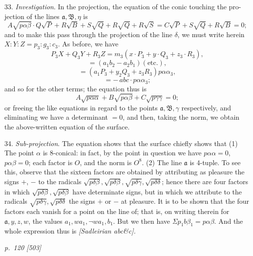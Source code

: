 \documentclass[11pt,a4paper]{book}
\begin{document}
33. \textit{Investigation}. In the projection, the equation of the conic touching the pro-
jection of the lines $\mathfrak{a}, \mathfrak{B}, \eta$ is
\[
A\sqrt{p\alpha\beta} \cdot Q\sqrt{P} + R\sqrt{B} + S\sqrt{Q} + R\sqrt{Q} + R\sqrt{S} = C\sqrt{P} + S\sqrt{Q} + R\sqrt{B} = 0;
\]
and to make this pass through the projection of the line $\delta$, we must write herein
$X : Y : Z = p_3 : g_3 : c_3$. As before, we have
\[
P_3 X + Q_3 Y + R_3 Z = m_3 (x \cdot P_3 + y \cdot Q_3 + z_3 \cdot R_3),
\]
\[
= (a_1 b_2 - a_2 b_1)(\text{etc.}),
\]
\[
= (a_1 P_3 + y_2 Q_3 + z_3 R_3) p\alpha\alpha_3,
\]
\[
= -\,abc \cdot p\alpha\alpha_3;
\]
and so for the other terms; the equation thus is
\[
A\sqrt{p\alpha\alpha} + B\sqrt{p\alpha\beta} + C\sqrt{p\gamma\gamma} = 0;
\]
or freeing the like equations in regard to the points $\mathfrak{a}, \mathfrak{B}, \gamma$ respectively, and eliminating
we have a determinant $= 0$, and then, taking the norm, we obtain the above-written
equation of the surface.

34. \textit{Sub-projection}. The equation shows that the surface chiefly shows that
\quad(1) The point $\alpha$ is 8-conical: in fact, by the point in question we have
$p\alpha\alpha = 0$, $p\alpha\beta = 0$; each factor is $O$, and the norm is $O^8$.
\quad(2) The line $\mathfrak{a}$ is 4-tuple. To see this, observe that the sixteen factors are
obtained by attributing as pleasure the signs $+$, $-$ to the radicals
$\sqrt{p\delta\beta}, \sqrt{p\delta\beta}, \sqrt{p\delta\gamma}, \sqrt{p\delta\delta}$; hence there are four factors in which $\sqrt{p\delta\beta}, \sqrt{p\delta\beta}$ have determinate signs, but in which we attribute to the radicals
$\sqrt{p\delta\gamma}, \sqrt{p\delta\delta}$ the signs $+$ or $-$ at pleasure. It is to be shown that the
four factors each vanish for a point on the line of; that is, on writing
therein for $\mathfrak{a}, y, z, w$, the values $a_1, w a_1, \neg w a_1, b_1$. But we then have
$\Sigma p_1 b\beta_1 = p\alpha\beta$. And the whole expression thus is
\textit{[Sadleirian abc\&c].}

\clearpage

\bigskip
\textit{p.~120 [503]}
\smallskip
\end{document}
